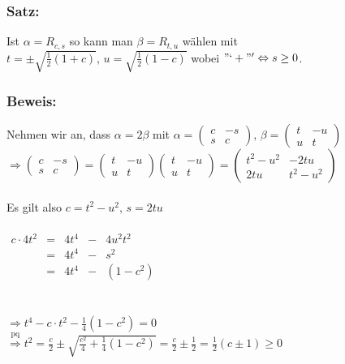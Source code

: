  \subsubsection{Satz:}
 Ist $\alpha = R_{c,s}$ so kann man $\beta = R_{t,u}$ wählen mit \\
 $t = \pm \sqrt{\frac{1}{2}(1+c)}, \, u=\sqrt{\frac{1}{2}(1-c)}$ wobei $"`+"' \Leftrightarrow s \geq 0$. 
 \subsubsection{Beweis:}
 Nehmen wir an, dass $\alpha = 2 \beta$ mit $\alpha = \begin{pmatrix} c & -s \\ s & c \end{pmatrix}, \, \beta = \begin{pmatrix} t & -u \\ u & t \end{pmatrix}$\\
 $\Rightarrow \begin{pmatrix} c & -s \\ s & c \end{pmatrix} = \begin{pmatrix} t & -u \\ u & t \end{pmatrix} \begin{pmatrix} t & -u \\ u & t \end{pmatrix} = \begin{pmatrix} t^{2}-u^{2} & -2tu \\ 2tu & t^{2}-u^{2} \end{pmatrix}$\\
 \qquad\\
 Es gilt also $c=t^{2}-u^{2}, \, s=2tu$\\ 
 \qquad\\
$
\begin{array}{rcrcr}
c \cdot 4t^{2} &=& 4t^{4} &-& 4u^{2}t^{2}\\
 &=& 4t^{4} &-&  s^{2}\\
 &=& 4t^{4} &-& (1-c^{2})
\end{array} 
$\\
\qquad\\
\qquad\\
$ \Rightarrow t^{4} - c\cdot t^{2} - \frac{1}{4}(1-c^{2})=0$\\
$\mathop{\Rightarrow}\limits^{\text{pq}}t^{2} = \frac{c}{2} \pm \sqrt{\frac{c^{2}}{4}+\frac{1}{4}(1-c^{2})} = \frac{c}{2} \pm \frac{1}{2}=\frac{1}{2}(c\pm 1) \geq 0$\\

